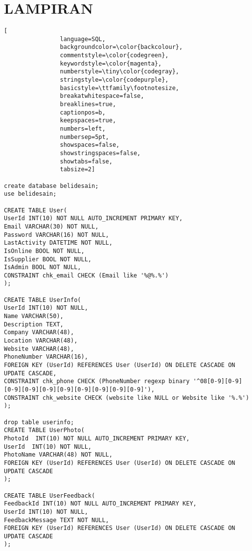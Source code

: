 \chapter*{LAMPIRAN}
\fancyhf{}
\renewcommand{\headrulewidth}{0pt}

\begin{lstlisting}[
				language=SQL,
				backgroundcolor=\color{backcolour},   
				commentstyle=\color{codegreen},
				keywordstyle=\color{magenta},
				numberstyle=\tiny\color{codegray},
				stringstyle=\color{codepurple},
				basicstyle=\ttfamily\footnotesize,
				breakatwhitespace=false,         
				breaklines=true,                 
				captionpos=b,                    
				keepspaces=true,                 
				numbers=left,                    
				numbersep=5pt,                  
				showspaces=false,                
				showstringspaces=false,
				showtabs=false,                  
				tabsize=2]
				
create database belidesain;
use belidesain;

CREATE TABLE User(
UserId INT(10) NOT NULL AUTO_INCREMENT PRIMARY KEY,
Email VARCHAR(30) NOT NULL,
Password VARCHAR(16) NOT NULL,
LastActivity DATETIME NOT NULL,
IsOnline BOOL NOT NULL,
IsSupplier BOOL NOT NULL,
IsAdmin BOOL NOT NULL,
CONSTRAINT chk_email CHECK (Email like '%@%.%')
);

CREATE TABLE UserInfo(
UserId INT(10) NOT NULL,
Name VARCHAR(50),
Description TEXT,
Company VARCHAR(48),
Location VARCHAR(48),
Website VARCHAR(48),
PhoneNumber VARCHAR(16),
FOREIGN KEY (UserId) REFERENCES User (UserId) ON DELETE CASCADE ON UPDATE CASCADE,
CONSTRAINT chk_phone CHECK (PhoneNumber regexp binary '^08[0-9][0-9][0-9][0-9][0-9][0-9][0-9][0-9][0-9][0-9]'),
CONSTRAINT chk_website CHECK (website like NULL or Website like '%.%')
);

drop table userinfo;
CREATE TABLE UserPhoto(
PhotoId  INT(10) NOT NULL AUTO_INCREMENT PRIMARY KEY,
UserId  INT(10) NOT NULL,
PhotoName VARCHAR(48) NOT NULL,
FOREIGN KEY (UserId) REFERENCES User (UserId) ON DELETE CASCADE ON UPDATE CASCADE
);

CREATE TABLE UserFeedback(
FeedbackId INT(10) NOT NULL AUTO_INCREMENT PRIMARY KEY,
UserId INT(10) NOT NULL,
FeedbackMessage TEXT NOT NULL,
FOREIGN KEY (UserId) REFERENCES User (UserId) ON DELETE CASCADE ON UPDATE CASCADE
);


\end{lstlisting}
